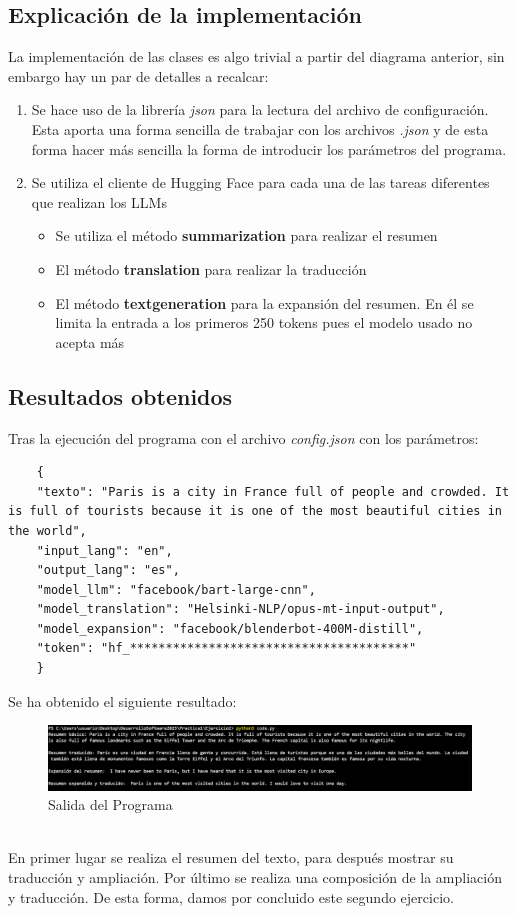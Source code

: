 \subsection{Explicación de la implementación}
La implementación de las clases es algo trivial a partir del diagrama anterior, sin embargo hay un par de detalles a recalcar: 
\begin{enumerate}
    \item Se hace uso de la librería \textit{json} para la lectura del archivo de configuración. Esta aporta una forma sencilla de trabajar con los archivos \textit{.json} y de esta forma hacer más sencilla la forma de introducir los parámetros del programa.
    
    \item Se utiliza el cliente de Hugging Face para cada una de las tareas diferentes que realizan los LLMs
    \begin{itemize}
        \item Se utiliza el método \textbf{summarization} para realizar el resumen
        \item El método \textbf{translation} para realizar la traducción
        \item El método \textbf{textgeneration} para la expansión del resumen. En él se limita la entrada a los primeros 250 tokens pues el modelo usado no acepta más
    \end{itemize}
\end{enumerate}

    
\subsection{Resultados obtenidos}
Tras la ejecución del programa con el archivo \textit{config.json} con los parámetros:
\begin{verbatim}
    {
    "texto": "Paris is a city in France full of people and crowded. It is full of tourists because it is one of the most beautiful cities in the world",
    "input_lang": "en",
    "output_lang": "es",
    "model_llm": "facebook/bart-large-cnn",
    "model_translation": "Helsinki-NLP/opus-mt-input-output",
    "model_expansion": "facebook/blenderbot-400M-distill",
    "token": "hf_***************************************"
    }
\end{verbatim}

Se ha obtenido el siguiente resultado: 
\begin{figure}[H] %
    \centering
    \includegraphics[width=1\textwidth]{Images/salida_programa_e2.png}
    \caption{Salida del Programa}
    \label{fig:mi_imagen}
\end{figure}
\\
En primer lugar se realiza el resumen del texto, para después mostrar su traducción y ampliación. Por último se realiza una composición de la ampliación y traducción. De esta forma, damos por concluido este segundo ejercicio.
\newpage

